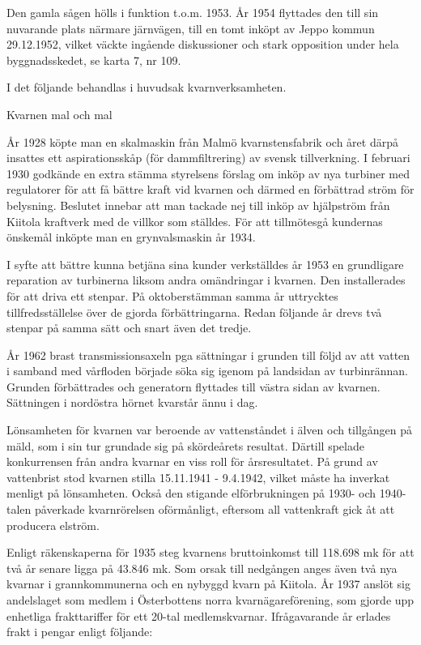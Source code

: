 Den gamla sågen hölls i funktion t.o.m. 1953. År 1954 flyttades den till sin nuvarande plats närmare järnvägen, till en tomt inköpt av Jeppo kommun 29.12.1952, vilket väckte ingående diskussioner och stark opposition under hela byggnadsskedet, se karta 7, nr 109.

I det följande behandlas i huvudsak kvarnverksamheten.


Kvarnen mal och mal

År 1928 köpte man en skalmaskin från Malmö kvarnstensfabrik och året därpå insattes ett aspirationsskåp (för dammfiltrering) av svensk tillverkning. I februari 1930 godkände en extra stämma styrelsens förslag om inköp av nya turbiner med regulatorer för att få bättre kraft vid kvarnen och därmed en förbättrad ström för belysning. Beslutet innebar att man tackade nej till inköp av hjälpström från Kiitola kraftverk med de villkor som ställdes. För att tillmötesgå kundernas önskemål inköpte man en grynvalsmaskin år 1934.

I syfte att bättre kunna betjäna sina kunder verkställdes år 1953 en grundligare reparation av turbinerna liksom andra omändringar i kvarnen. Den  installerades för att driva ett stenpar. På oktoberstämman  samma år uttrycktes tillfredsställelse över de gjorda förbättringarna. Redan följande år drevs två stenpar på samma sätt och snart även det tredje.

År 1962 brast transmissionsaxeln pga sättningar i grunden till följd av att vatten i samband med vårfloden började söka sig igenom på landsidan av turbinrännan. Grunden förbättrades och generatorn flyttades till västra sidan av kvarnen. Sättningen i nordöstra hörnet kvarstår ännu i dag.

Lönsamheten för kvarnen var beroende av vattenståndet i älven och tillgången på mäld, som i sin tur grundade sig på skördeårets resultat. Därtill spelade konkurrensen från andra kvarnar en viss roll för årsresultatet. På grund av vattenbrist stod kvarnen stilla 15.11.1941 - 9.4.1942, vilket måste ha inverkat menligt på lönsamheten. Också den stigande elförbrukningen på 1930- och 1940-talen påverkade kvarnrörelsen oförmånligt, eftersom all vattenkraft gick åt att producera elström.

Enligt räkenskaperna för 1935 steg kvarnens bruttoinkomst till 118.698 mk för att två år senare ligga på 43.846 mk. Som orsak till nedgången anges även två nya kvarnar i grannkommunerna och en nybyggd kvarn på Kiitola. År 1937 anslöt sig andelslaget som medlem i Österbottens norra kvarnägareförening, som gjorde upp enhetliga frakttariffer för ett 20-tal medlemskvarnar.
Ifrågavarande år erlades frakt i pengar enligt följande:

